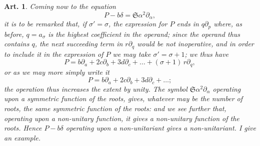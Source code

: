 \documentclass[11pt,a4paper]{article}
\theoremstyle{cayley}
\newtheorem{art}{Art.}[section]
\begin{document}
\setcounter{art}{24}
\begin{art}
Coming now to the equation
\[
P - b\delta = \mathfrak{S}\alpha^{2}\partial_{\alpha},
\]
it is to be remarked that, if $\sigma' = \sigma$, the expression for $P$ ends in $q\partial_{p}$ where, as before, $q = a_{\sigma}$ is the highest coefficient in the operand; since the operand thus contains $q$, the next succeeding term in $r\partial_{q}$ would be not inoperative, and in order to include it in the expression of $P$ we may take $\sigma' = \sigma + 1$; we thus have
\[
P = b\partial_{a} + 2c\partial_{b} + 3d\partial_{c} + \ldots + (\sigma + 1)\,r\partial_{q},
\]
or as we may more simply write it
\[
P = b\partial_{a} + 2c\partial_{b} + 3d\partial_{c} + \ldots;
\]
the operation thus increases the extent by unity. The symbol $\mathfrak{S}\alpha^{2}\partial_{\alpha}$ operating upon a symmetric function of the roots, gives, whatever may be the number of roots, the same symmetric function of the roots: and we see further that, operating upon a non-unitary function, it gives a non-unitary function of the roots. Hence $P - b\delta$ operating upon a non-unitariant gives a non-unitariant. I give an example.
\end{art}
\end{document}
